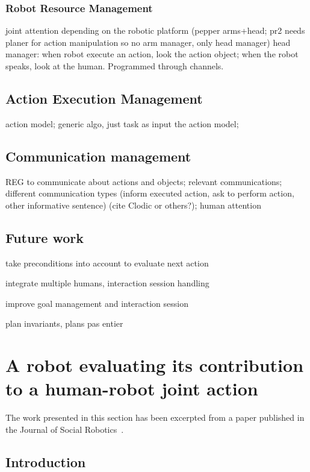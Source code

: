\documentclass[a4paper,11pt,twoside]{StyleThese}
\begin{document}
\subsubsection{Robot Resource Management}
joint attention
depending on the robotic platform (pepper arms+head; pr2 needs planer for action manipulation so no arm manager, only head manager)
head manager: when robot execute an action, look the action object; when the robot speaks, look at the human. Programmed through channels.

\subsection{Action Execution Management}
action model;
generic algo, just task as input the action model;

\subsection{Communication management}
REG to communicate about actions and objects;
relevant communications;
different communication types (inform executed action, ask to perform action, other informative sentence) (cite Clodic or others?);
human attention

\subsection{Future work}
take preconditions into account to evaluate next action

integrate multiple humans, interaction session handling

improve goal management and interaction session

plan invariants, plans pas entier
 

\section{A robot evaluating its contribution to a human-robot joint action}\label{chap2:sec:qoi}

The work presented in this section has been excerpted from a paper published in the Journal of Social Robotics~\cite{mayima_2021_towards}.

\subsection{Introduction}
\end{document}
